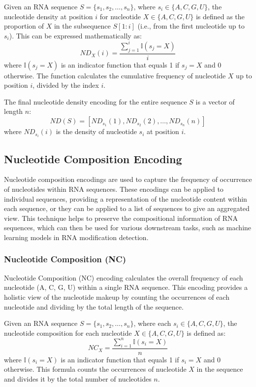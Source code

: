    Given an RNA sequence $S = \{s_1, s_2, \dots, s_n\}$, where $s_i \in \{A, C, G, U\}$, the nucleotide density at position $i$ for nucleotide $X \in \{A, C, G, U\}$ is defined as the proportion of $X$ in the subsequence $S[1:i]$ (i.e., from the first nucleotide up to $s_i$). This can be expressed mathematically as:
    \[
      ND_X(i) = \frac{\sum_{j=1}^{i} \mathbb{I}(s_j = X)}{i}
    \]
    where $\mathbb{I}(s_j = X)$ is an indicator function that equals 1 if $s_j = X$ and 0 otherwise.
    The function calculates the cumulative frequency of nucleotide $X$ up to position $i$, divided by the index $i$.

    The final nucleotide density encoding for the entire sequence $S$ is a vector of length $n$:
    \[
      ND(S) = [ND_{s_1}(1), ND_{s_2}(2), \dots, ND_{s_n}(n)]
    \]
    where $ND_{s_i}(i)$ is the density of nucleotide $s_i$ at position $i$.

  \subsection{Nucleotide Composition Encoding}\label{subsec:nucleotide-composition-encoding}
    Nucleotide composition encodings are used to capture the frequency of occurrence of nucleotides within RNA sequences.
    These encodings can be applied to individual sequences, providing a representation of the nucleotide content within each sequence, or they can be applied to a list of sequences to give an aggregated view.
    This technique helps to preserve the compositional information of RNA sequences, which can then be used for various downstream tasks, such as machine learning models in RNA modification detection.

    \subsubsection{Nucleotide Composition (NC)}\label{subsubsec:nc}
      Nucleotide Composition (NC) encoding calculates the overall frequency of each nucleotide (A, C, G, U) within a single RNA sequence.
      This encoding provides a holistic view of the nucleotide makeup by counting the occurrences of each nucleotide and dividing by the total length of the sequence.

      Given an RNA sequence $S = \{s_1, s_2, \dots, s_n\}$, where each $s_i \in \{A, C, G, U\}$, the nucleotide composition for each nucleotide $X \in \{A, C, G, U\}$ is defined as:
      \[
        NC_X = \frac{\sum_{i=1}^{n} \mathbb{I}(s_i = X)}{n}
      \]
      where $\mathbb{I}(s_i = X)$ is an indicator function that equals 1 if $s_i = X$ and 0 otherwise.
      This formula counts the occurrences of nucleotide $X$ in the sequence and divides it by the total number of nucleotides $n$.

